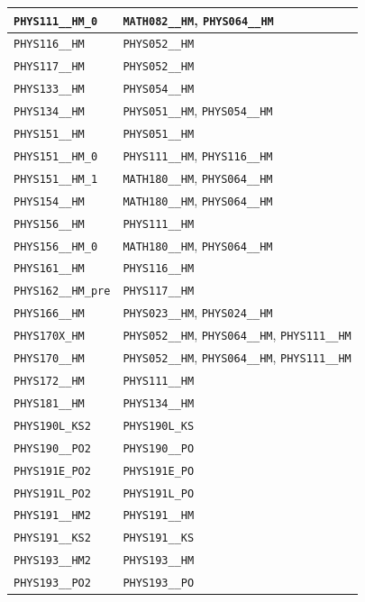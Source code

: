 \begin{longtable}{|p{4.4in}|p{4.4in}|}
    \verb|PHYS111__HM_0| & \verb|MATH082__HM|, \verb|PHYS064__HM|\\\hline
    \verb|PHYS116__HM| & \verb|PHYS052__HM|\\\hline
    \verb|PHYS117__HM| & \verb|PHYS052__HM|\\\hline
    \verb|PHYS133__HM| & \verb|PHYS054__HM|\\\hline
    \verb|PHYS134__HM| & \verb|PHYS051__HM|, \verb|PHYS054__HM|\\\hline
    \verb|PHYS151__HM| & \verb|PHYS051__HM|\\\hline
    \verb|PHYS151__HM_0| & \verb|PHYS111__HM|, \verb|PHYS116__HM|\\\hline
    \verb|PHYS151__HM_1| & \verb|MATH180__HM|, \verb|PHYS064__HM|\\\hline
    \verb|PHYS154__HM| & \verb|MATH180__HM|, \verb|PHYS064__HM|\\\hline
    \verb|PHYS156__HM| & \verb|PHYS111__HM|\\\hline
    \verb|PHYS156__HM_0| & \verb|MATH180__HM|, \verb|PHYS064__HM|\\\hline
    \verb|PHYS161__HM| & \verb|PHYS116__HM|\\\hline
    \verb|PHYS162__HM_pre| & \verb|PHYS117__HM|\\\hline
    \verb|PHYS166__HM| & \verb|PHYS023__HM|, \verb|PHYS024__HM|\\\hline
    \verb|PHYS170X_HM| & \verb|PHYS052__HM|, \verb|PHYS064__HM|, \verb|PHYS111__HM|\\\hline
    \verb|PHYS170__HM| & \verb|PHYS052__HM|, \verb|PHYS064__HM|, \verb|PHYS111__HM|\\\hline
    \verb|PHYS172__HM| & \verb|PHYS111__HM|\\\hline
    \verb|PHYS181__HM| & \verb|PHYS134__HM|\\\hline
    \verb|PHYS190L_KS2| & \verb|PHYS190L_KS|\\\hline
    \verb|PHYS190__PO2| & \verb|PHYS190__PO|\\\hline
    \verb|PHYS191E_PO2| & \verb|PHYS191E_PO|\\\hline
    \verb|PHYS191L_PO2| & \verb|PHYS191L_PO|\\\hline
    \verb|PHYS191__HM2| & \verb|PHYS191__HM|\\\hline
    \verb|PHYS191__KS2| & \verb|PHYS191__KS|\\\hline
    \verb|PHYS193__HM2| & \verb|PHYS193__HM|\\\hline
    \verb|PHYS193__PO2| & \verb|PHYS193__PO|\\\hline

\end{longtable}
